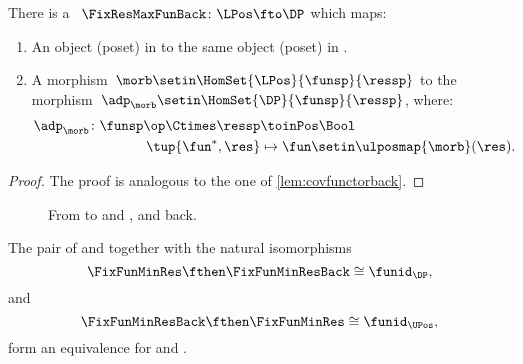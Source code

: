 \begin{lemma}
    \label{lem:cofunctorback}
    There is a ~$\FixResMaxFunBack\colon \LPos \fto \DP$ which maps:
    \begin{enumerate}
        \item An object (poset) in \UPos to the same object (poset) in \DP.
        \item A morphism~$\morb\setin \HomSet{\LPos}{\funsp}{\ressp}$ to the morphism~$\adp_\morb \setin \HomSet{\DP}{\funsp}{\ressp}$, where:
              \begin{equation}
                  \begin{aligned}
                      \adp_\morb\colon \funsp\op \Ctimes \ressp & \toinPos \Bool \\
                      \tup{\fun^*,\res}                         & \mapsto \fun \setin \ulposmap{\morb}(\res).
                  \end{aligned}
              \end{equation}
    \end{enumerate}
\end{lemma}

\begin{proof}
    The proof is analogous to the one of \cref{lem:covfunctorback}.
\end{proof}

\begin{figure}[tbh]
    \centering
    \caption{From \DP to \UPos and \LPos, and back.}
\end{figure}


\begin{lemma}
    The pair of \FixFunMinRes and \FixFunMinResBack together with the natural isomorphisms
    \begin{equation}
        \FixFunMinRes \fthen \FixFunMinResBack \cong \funid_\DP,
    \end{equation}
    and
    \begin{equation}
        \FixFunMinResBack \fthen \FixFunMinRes \cong \funid_\UPos,
    \end{equation}
    form an equivalence for \DP and \UPos.
\end{lemma}

